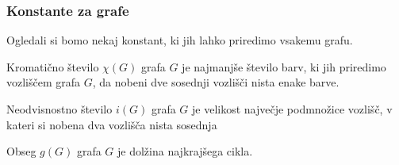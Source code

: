 \subsubsection{Konstante za grafe}
Ogledali si bomo nekaj konstant, ki jih lahko priredimo vsakemu grafu\cite{ramanujan-construction-book}.

\begin{definicija}
    Kromatično število \(\chi(G)\) grafa \(G\) je najmanjše število barv, ki jih priredimo vozliščem grafa \(G\), da nobeni dve sosednji vozlišči nista enake barve.
\end{definicija}
\begin{definicija}
    Neodvisnostno število \(i(G)\) grafa \(G\) je velikost največje podmnožice vozlišč, v kateri si nobena dva vozlišča nista sosednja
\end{definicija}
\begin{definicija}
    Obseg \(g(G)\) grafa \(G\) je dolžina najkrajšega cikla.
\end{definicija}

